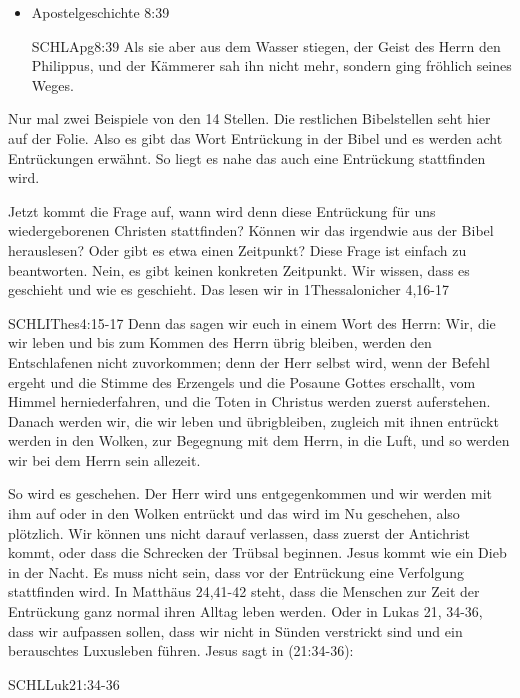 \begin{otsblock}
\begin{itemize}
            \item Apostelgeschichte 8:39
                  \begin{bibelbox}{SCHL}{Apg}{8:39}
                      Als sie aber aus dem Wasser stiegen,  der Geist des Herrn den Philippus, und der Kämmerer sah ihn nicht mehr, sondern ging fröhlich seines Weges.
                  \end{bibelbox}
        \end{itemize}
        Nur mal zwei Beispiele von den 14 Stellen. Die restlichen Bibelstellen seht hier auf der Folie. Also es gibt das Wort Entrückung in der Bibel und es werden acht Entrückungen erwähnt. So liegt es nahe das auch eine Entrückung stattfinden wird.

        Jetzt kommt die Frage auf, wann wird denn diese Entrückung für uns wiedergeborenen Christen stattfinden? Können wir das irgendwie aus der Bibel herauslesen? Oder gibt es etwa einen Zeitpunkt? Diese Frage ist einfach zu beantworten. Nein, es gibt keinen konkreten Zeitpunkt. Wir wissen, dass es geschieht und wie es geschieht. Das lesen wir in 1Thessalonicher 4,16-17
        \begin{bibelbox}{SCHL}{IThes}{4:15-17}
            Denn das sagen wir euch in einem Wort des Herrn: Wir, die wir leben und bis zum Kommen des Herrn übrig bleiben, werden den Entschlafenen nicht zuvorkommen; denn der Herr selbst wird, wenn der Befehl ergeht und die Stimme des Erzengels und die Posaune Gottes erschallt, vom Himmel herniederfahren, und die Toten in Christus werden zuerst auferstehen. Danach werden wir, die wir leben und übrigbleiben, zugleich mit ihnen entrückt werden in den Wolken, zur Begegnung mit dem Herrn, in die Luft, und so werden wir bei dem Herrn sein allezeit.
        \end{bibelbox}
        So wird es geschehen. Der Herr wird uns entgegenkommen und wir werden mit ihm auf oder in den Wolken entrückt und das wird im Nu geschehen, also plötzlich. Wir können uns nicht darauf verlassen, dass zuerst der Antichrist kommt, oder dass die Schrecken der Trübsal beginnen. Jesus kommt wie ein Dieb in der Nacht.
        Es muss nicht sein, dass vor der Entrückung eine Verfolgung stattfinden wird. In Matthäus 24,41-42 steht, dass die Menschen zur Zeit der Entrückung ganz normal ihren Alltag leben werden. Oder in Lukas 21, 34-36, dass wir aufpassen sollen, dass wir nicht in Sünden verstrickt sind und ein berauschtes Luxusleben führen.
        Jesus sagt in (21:34-36):
        \begin {bibelbox}{SCHL}{Luk}{21:34-36}

\end{bibelbox}
\end{otsblock}
